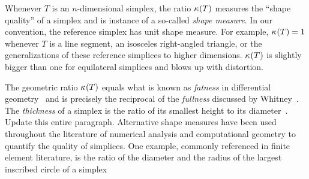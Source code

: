\documentclass[10pt,letterpaper]{article}
\newcommand{\mwl}[1]{{\color{red}#1}}
\begin{document}
\begin{remark}
    Whenever $T$ is an $n$-dimensional simplex, the ratio $\kappa_{}(T)$ measures the ``shape quality'' of a simplex and is instance of a so-called \emph{shape measure}.
    In our convention, the reference simplex has unit shape measure.
    For example, $\kappa_{}(T)=1$ whenever $T$ is a line segment, an isosceles right-angled triangle, or the generalizations of these reference simplices to higher dimensions. $\kappa_{}(T)$ is slightly bigger than one for equilateral simplices and blows up with distortion.

    The geometric ratio $\kappa_{}(T)$ equals what is known as \emph{fatness} in differential geometry~\cite{cheeger1984curvature} and is precisely the reciprocal of the \emph{fullness} discussed by Whitney~\cite{whitney2012geometric}. 
    The \emph{thickness} of a simplex is the ratio of its smallest height to its diameter~\cite{munkres2016elementary}. \mwl{Update this entire paragraph.}
    Alternative shape measures have been used throughout the literature of numerical analysis and computational geometry to quantify the quality of simplices.
    One example, commonly referenced in finite element literature, is the ratio of the diameter and the radius of the largest inscribed circle of a simplex 
\end{remark}
\end{document}
